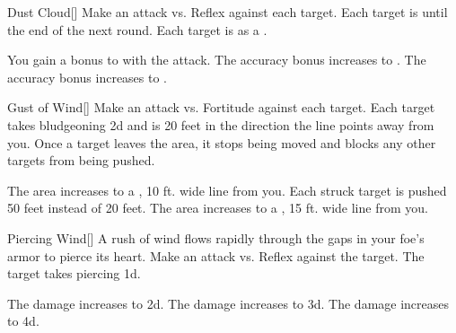 \lowercase{\hypertarget{spell:Dust Cloud}{}}\label{spell:Dust Cloud}
\begin{freeability}[Rank 2]{\hypertarget{spell:Dust Cloud}{Dust Cloud}}[]
Make an attack vs. Reflex against each target.
\hit Each target is  until the end of the next round.
\crit Each target is  as a .

\rankline
{} You gain a  bonus to  with the attack.
 The accuracy bonus increases to .
 The accuracy bonus increases to .
\end{freeability}
\vspace{0.25em}



\lowercase{\hypertarget{spell:Gust of Wind}{}}\label{spell:Gust of Wind}
\begin{freeability}[Rank 2]{\hypertarget{spell:Gust of Wind}{Gust of Wind}}[]
Make an attack vs. Fortitude against each target.
\hit Each target takes bludgeoning  \minus2d and is  20 feet in the direction the line points away from you.
Once a target leaves the area, it stops being moved and blocks any other targets from being pushed.

\rankline
{} The area increases to a \areahuge, 10 ft. wide line from you.
 Each struck target is pushed 50 feet instead of 20 feet.
 The area increases to a \areaext, 15 ft. wide line from you.
\end{freeability}
\vspace{0.25em}



\lowercase{\hypertarget{spell:Piercing Wind}{}}\label{spell:Piercing Wind}
\begin{freeability}[Rank 2]{\hypertarget{spell:Piercing Wind}{Piercing Wind}}[]
A rush of wind flows rapidly through the gaps in your foe's armor to pierce its heart.
Make an attack vs. Reflex against the target.
\hit The target takes piercing  \plus1d.

\rankline
{} The damage increases to  \plus2d.
 The damage increases to  \plus3d.
 The damage increases to  \plus4d.
\end{freeability}
\vspace{0.25em}




